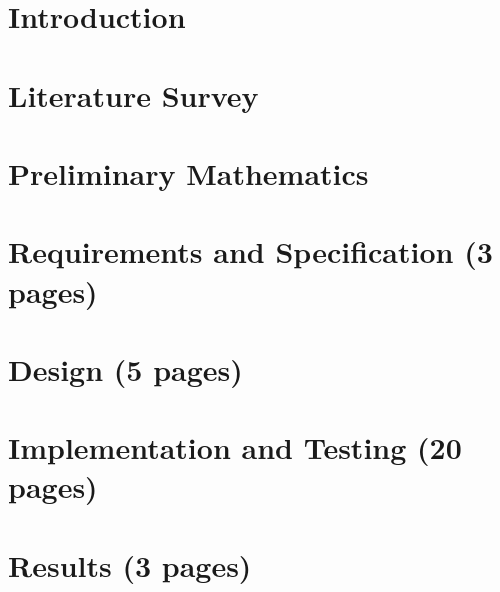 
%
%
%
%
%
%
%
%
%
%
%
%
%



\chapter{Introduction}

\chapter{Literature Survey}

\chapter{Preliminary Mathematics}


\chapter{Requirements and Specification (3 pages)}


\chapter{Design (5 pages)}


\chapter{Implementation and Testing (20 pages)}


\chapter{Results (3 pages)}

